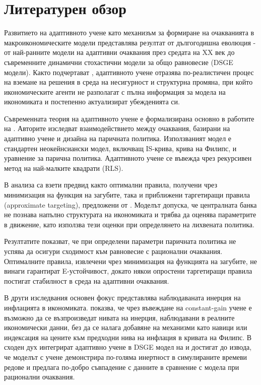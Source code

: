 \chapter{Литературен обзор}

Развитието на адаптивното учене като механизъм за формиране на очакванията в макроикономическите модели представлява резултат от дългогодишна еволюция - от най-ранните модели на адаптивни очаквания през средата на XX век до съвременните динамични стохастични модели за общо равновесие (DSGE модели). Както подчертават \textcite{Eusepi_Preston2023}, адаптивното учене отразява по-реалистичен процес на вземане на решения в среда на несигурност и структурна промяна, при който икономическите агенти не разполагат с пълна информация за модела на икономиката и постепенно актуализират убежденията си.

Съвременната теория на адаптивното учене е формализирана основно в работите на \textcite{Evans2003}. 
Авторите изследват взаимодействието между очаквания, базирани на адаптивно учене и дизайна на паричната политика. Използваният модел е стандартен неокейнсиански модел, включващ IS-крива, крива на Филипс, и уравнение за парична политика. Адаптивното учене се въвежда чрез рекурсивен метод на най-малките квадрати (RLS). 

В анализа са взети предвид както оптимални правила, получени чрез минимизация на функция на загубите, така и приближени таргетиращи правила (approximate targeting), предложени от \textcite{Mccallum_Nelson2004}. Моделът допуска, че централната банка не познава напълно структурата на икономиката и трябва да оценява параметрите в движение, като използва тези оценки при определянето на лихвената политика. 

Резултатите показват, че при определени параметри паричната политика не успява да осигури сходимост към равновесие с рационални очаквания. Оптималните правила, извлечени чрез минимизация на функцията на загубите, не винаги гарантират E-устойчивост, докато някои опростени таргетиращи правила постигат стабилност в среда на адаптивни очаквания. 

В други изследвания основен фокус представлява наблюдаваната инерция  на инфлацията в икономиката. \textcite{MILANI20072065} показва, че чрез въвеждане на constant-gain учене е възможно да се възпроизведат нивата на инерция, наблюдавани в реалните икономически данни, без да се налага добавяне на механизми като навици или индексация на цените към предходни нива на инфлация в кривата на Филипс. В сходен дух \textcite{SLOBODYAN201226} интегрират адаптивно учене в DSGE модел на \textcite{Smets_Wouters2007} и достигат до извода, че моделът с учене демонстрира по-голяма инертност в симулираните времеви редове и предлага по-добро съвпадение с данните в сравнение с модела при рационални очаквания.

